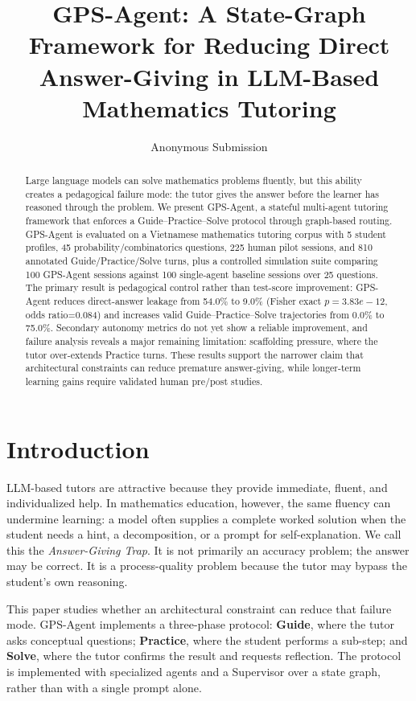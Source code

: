 \documentclass[11pt]{article}
\title{GPS-Agent: A State-Graph Framework for Reducing Direct Answer-Giving in LLM-Based Mathematics Tutoring}
\author{Anonymous Submission}
\begin{document}
\maketitle
\begin{abstract}
Large language models can solve mathematics problems fluently, but this ability creates a pedagogical failure mode: the tutor gives the answer before the learner has reasoned through the problem. We present GPS-Agent, a stateful multi-agent tutoring framework that enforces a Guide--Practice--Solve protocol through graph-based routing. GPS-Agent is evaluated on a Vietnamese mathematics tutoring corpus with 5 student profiles, 45 probability/combinatorics questions, 225 human pilot sessions, and 810 annotated Guide/Practice/Solve turns, plus a controlled simulation suite comparing 100 GPS-Agent sessions against 100 single-agent baseline sessions over 25 questions. The primary result is pedagogical control rather than test-score improvement: GPS-Agent reduces direct-answer leakage from 54.0\% to 9.0\% (Fisher exact $p=3.83e-12$, odds ratio=0.084) and increases valid Guide--Practice--Solve trajectories from 0.0\% to 75.0\%. Secondary autonomy metrics do not yet show a reliable improvement, and failure analysis reveals a major remaining limitation: scaffolding pressure, where the tutor over-extends Practice turns. These results support the narrower claim that architectural constraints can reduce premature answer-giving, while longer-term learning gains require validated human pre/post studies.
\end{abstract}

\section{Introduction}
LLM-based tutors are attractive because they provide immediate, fluent, and individualized help. In mathematics education, however, the same fluency can undermine learning: a model often supplies a complete worked solution when the student needs a hint, a decomposition, or a prompt for self-explanation. We call this the \emph{Answer-Giving Trap}. It is not primarily an accuracy problem; the answer may be correct. It is a process-quality problem because the tutor may bypass the student's own reasoning.

This paper studies whether an architectural constraint can reduce that failure mode. GPS-Agent implements a three-phase protocol: \textbf{Guide}, where the tutor asks conceptual questions; \textbf{Practice}, where the student performs a sub-step; and \textbf{Solve}, where the tutor confirms the result and requests reflection. The protocol is implemented with specialized agents and a Supervisor over a state graph, rather than with a single prompt alone.
\end{document}
